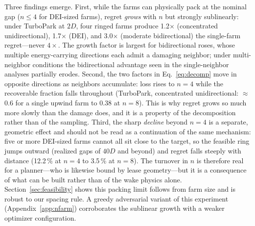 \documentclass[wes, manuscript]{copernicus}
\begin{document}
Three findings emerge.
First, while the farms can physically pack at the nominal gap ($n \leq 4$ for DEI-sized farms), regret \emph{grows} with $n$ but strongly sublinearly: under TurboPark at $2D$, four ringed farms produce 1.2$\times$ (concentrated unidirectional), 1.7$\times$ (DEI), and 3.0$\times$ (moderate bidirectional) the single-farm regret---never $4\times$.
The growth factor is largest for bidirectional roses, whose multiple energy-carrying directions each admit a damaging neighbor; under multi-neighbor conditions the bidirectional advantage seen in the single-neighbor analyses partially erodes.
Second, the two factors in Eq.~\eqref{eq:decomp} move in opposite directions as neighbors accumulate: loss rises to $n = 4$ while the recoverable fraction falls throughout (TurboPark, concentrated unidirectional: $\approx$0.6 for a single upwind farm to 0.38 at $n = 8$).
This is why regret grows so much more slowly than the damage does, and it is a property of the decomposition rather than of the sampling.
Third, the sharp \emph{decline} beyond $n = 4$ is a separate, geometric effect and should not be read as a continuation of the same mechanism: five or more DEI-sized farms cannot all sit close to the target, so the feasible ring jumps outward (realized gaps of $40D$ and beyond) and regret falls steeply with distance (12.2\,\% at $n = 4$ to 3.5\,\% at $n = 8$).
The turnover in $n$ is therefore real for a planner---who is likewise bound by lease geometry---but it is a consequence of what can be built rather than of the wake physics alone.
Section~\ref{sec:feasibility} shows this packing limit follows from farm size and is robust to our spacing rule.
A greedy adversarial variant of this experiment (Appendix~\ref{app:nfarm}) corroborates the sublinear growth with a weaker optimizer configuration.
\end{document}
